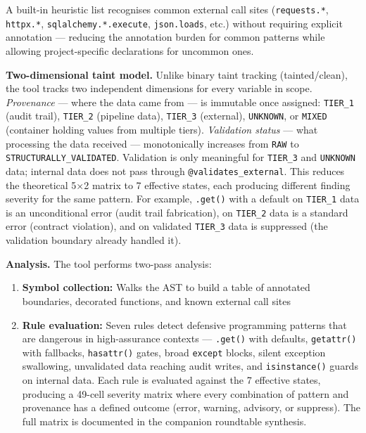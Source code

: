 \documentclass[a4paper,11pt]{report}
\providecommand{\tightlist}{%
  \setlength{\itemsep}{0pt}\setlength{\parskip}{0pt}}
\begin{document}
A built-in heuristic list recognises common external call sites
(\texttt{requests.*}, \texttt{httpx.*}, \texttt{sqlalchemy.*.execute},
\texttt{json.loads}, etc.) without requiring explicit annotation ---
reducing the annotation burden for common patterns while allowing
project-specific declarations for uncommon ones.

\textbf{Two-dimensional taint model.} Unlike binary taint tracking
(tainted/clean), the tool tracks two independent dimensions for every
variable in scope. \emph{Provenance} --- where the data came from --- is
immutable once assigned: \texttt{TIER\_1} (audit trail),
\texttt{TIER\_2} (pipeline data), \texttt{TIER\_3} (external),
\texttt{UNKNOWN}, or \texttt{MIXED} (container holding values from
multiple tiers). \emph{Validation status} --- what processing the data
received --- monotonically increases from \texttt{RAW} to
\texttt{STRUCTURALLY\_VALIDATED}. Validation is only meaningful for
\texttt{TIER\_3} and \texttt{UNKNOWN} data; internal data does not pass
through \texttt{@validates\_external}. This reduces the theoretical 5×2
matrix to 7 effective states, each producing different finding severity
for the same pattern. For example, \texttt{.get()} with a default on
\texttt{TIER\_1} data is an unconditional error (audit trail
fabrication), on \texttt{TIER\_2} data is a standard error (contract
violation), and on validated \texttt{TIER\_3} data is suppressed (the
validation boundary already handled it).

\textbf{Analysis.} The tool performs two-pass analysis:

\begin{enumerate}
\def\labelenumi{\arabic{enumi}.}
\tightlist
\item
  \textbf{Symbol collection:} Walks the AST to build a table of
  annotated boundaries, decorated functions, and known external call
  sites
\item
  \textbf{Rule evaluation:} Seven rules detect defensive programming
  patterns that are dangerous in high-assurance contexts ---
  \texttt{.get()} with defaults, \texttt{getattr()} with fallbacks,
  \texttt{hasattr()} gates, broad \texttt{except} blocks, silent
  exception swallowing, unvalidated data reaching audit writes, and
  \texttt{isinstance()} guards on internal data. Each rule is evaluated
  against the 7 effective states, producing a 49-cell severity matrix
  where every combination of pattern and provenance has a defined
  outcome (error, warning, advisory, or suppress). The full matrix is
  documented in the companion roundtable synthesis.
\end{enumerate}
\end{document}

